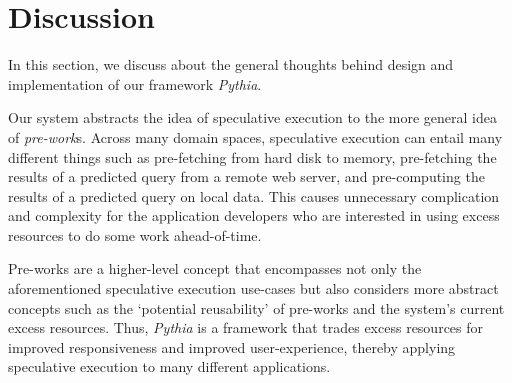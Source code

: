 \section{Discussion}
\label{sec:discuss}
In this section, we discuss about the general thoughts behind design and
implementation of our framework {\it Pythia}.

Our system abstracts the idea of speculative execution to the more general idea
of {\it pre-work}s. 
Across many domain spaces, speculative execution can entail many different
things such as pre-fetching from hard disk to memory, pre-fetching the results
of a predicted query from a remote web server, and pre-computing the results of
a predicted query on local data. 
This causes unnecessary complication and complexity for the application
developers who are interested in using excess resources to do some work
ahead-of-time. 

Pre-works are a higher-level concept that encompasses not only the aforementioned
speculative execution use-cases but also considers more abstract concepts such
as the `potential reusability' of pre-works and the system's current excess
resources. 
Thus, {\it Pythia} is a framework that trades excess resources for
improved responsiveness and improved user-experience, thereby applying 
speculative execution to many different applications.



